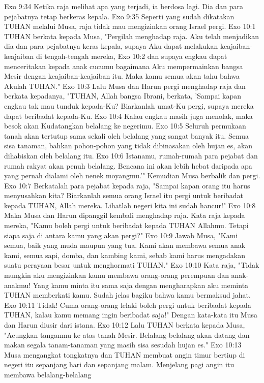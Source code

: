 Exo 9:34  Ketika raja melihat apa yang terjadi, ia berdosa lagi. Dia dan para pejabatnya tetap berkeras kepala.
Exo 9:35  Seperti yang sudah dikatakan TUHAN melalui Musa, raja tidak mau mengizinkan orang Israel pergi.
Exo 10:1  TUHAN berkata kepada Musa, "Pergilah menghadap raja. Aku telah menjadikan dia dan para pejabatnya keras kepala, supaya Aku dapat melakukan keajaiban-keajaiban di tengah-tengah mereka,
Exo 10:2  dan supaya engkau dapat menceritakan kepada anak cucumu bagaimana Aku mempermainkan bangsa Mesir dengan keajaiban-keajaiban itu. Maka kamu semua akan tahu bahwa Akulah TUHAN."
Exo 10:3  Lalu Musa dan Harun pergi menghadap raja dan berkata kepadanya, "TUHAN, Allah bangsa Ibrani, berkata, 'Sampai kapan engkau tak mau tunduk kepada-Ku? Biarkanlah umat-Ku pergi, supaya mereka dapat beribadat kepada-Ku.
Exo 10:4  Kalau engkau masih juga menolak, maka besok akan Kudatangkan belalang ke negerimu.
Exo 10:5  Seluruh permukaan tanah akan tertutup sama sekali oleh belalang yang sangat banyak itu. Semua sisa tanaman, bahkan pohon-pohon yang tidak dibinasakan oleh hujan es, akan dihabiskan oleh belalang itu.
Exo 10:6  Istanamu, rumah-rumah para pejabat dan rumah rakyat akan penuh belalang. Bencana ini akan lebih hebat daripada apa yang pernah dialami oleh nenek moyangmu.'" Kemudian Musa berbalik dan pergi.
Exo 10:7  Berkatalah para pejabat kepada raja, "Sampai kapan orang itu harus menyusahkan kita? Biarkanlah semua orang Israel itu pergi untuk beribadat kepada TUHAN, Allah mereka. Lihatlah negeri kita ini sudah hancur!"
Exo 10:8  Maka Musa dan Harun dipanggil kembali menghadap raja. Kata raja kepada mereka, "Kamu boleh pergi untuk beribadat kepada TUHAN Allahmu. Tetapi siapa saja di antara kamu yang akan pergi?"
Exo 10:9  Jawab Musa, "Kami semua, baik yang muda maupun yang tua. Kami akan membawa semua anak kami, semua sapi, domba, dan kambing kami, sebab kami harus mengadakan suatu perayaan besar untuk menghormati TUHAN."
Exo 10:10  Kata raja, "Tidak mungkin aku mengizinkan kamu membawa orang-orang perempuan dan anak-anakmu! Yang kamu minta itu sama saja dengan mengharapkan aku meminta TUHAN memberkati kamu. Sudah jelas bagiku bahwa kamu bermaksud jahat.
Exo 10:11  Tidak! Cuma orang-orang lelaki boleh pergi untuk beribadat kepada TUHAN, kalau kamu memang ingin beribadat saja!" Dengan kata-kata itu Musa dan Harun diusir dari istana.
Exo 10:12  Lalu TUHAN berkata kepada Musa, "Acungkan tanganmu ke atas tanah Mesir. Belalang-belalang akan datang dan makan segala tanam-tanaman yang masih sisa sesudah hujan es."
Exo 10:13  Musa mengangkat tongkatnya dan TUHAN membuat angin timur bertiup di negeri itu sepanjang hari dan sepanjang malam. Menjelang pagi angin itu membawa belalang-belalang

